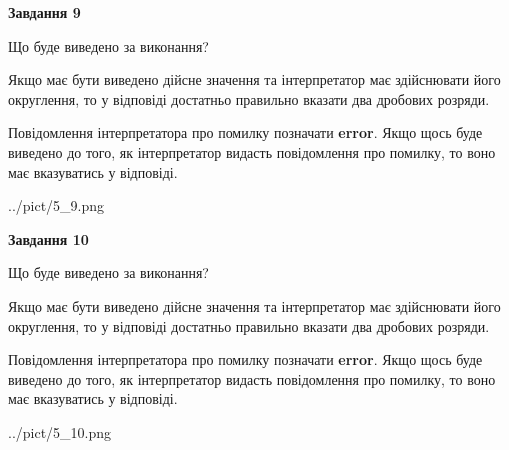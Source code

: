 \documentclass[12pt, ukrainian]{article}
\begin{document}
{\begin {Large}
{\begin {center}\textbf{Завдання 9}\end {center}}\par
Що буде виведено за виконання? \par

Якщо має бути виведено дійсне значення та інтерпретатор має здійснювати його округлення, 
то у відповіді достатньо правильно вказати два дробових розряди.

Повідомлення інтерпретатора про помилку позначати \textbf{error}.
Якщо щось буде виведено до того, як інтерпретатор видасть повідомлення про помилку, 
то воно має вказуватись у відповіді. \par

\begin{center}
	{../pict/5_9.png}
\end{center}
\newpage

{\begin {center}\textbf{Завдання 10}\end {center}}\par
Що буде виведено за виконання? \par

Якщо має бути виведено дійсне значення та інтерпретатор має здійснювати його округлення, 
то у відповіді достатньо правильно вказати два дробових розряди.

Повідомлення інтерпретатора про помилку позначати \textbf{error}.
Якщо щось буде виведено до того, як інтерпретатор видасть повідомлення про помилку, 
то воно має вказуватись у відповіді. \par

\begin{center}
	{../pict/5_10.png}
\end{center}
\newpage

\end {Large}}
\end{document}
